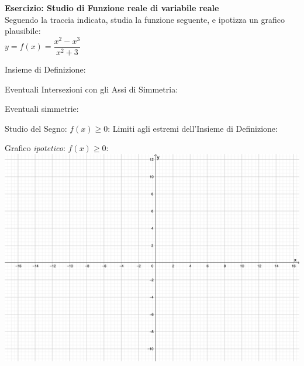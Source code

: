 \documentclass[12pt, a4paper, landscape]{exam}
\newcommand{\class}{\LARGE {Esercizio: Studio di Funzione reale di variabile reale}}
\begin{document}

{\huge{\bf \class}}\\

{\Large{Seguendo la traccia indicata, studia la funzione seguente, e ipotizza un grafico plausibile}}:\\

{\large {\(y = f(x) = \dfrac {x^2 - x^3}{x^2 + 3}\)}}\\


\begin{questions}

\begin{multicols}{2}
\question
Insieme di Definizione:
\fillwithdottedlines{0.5in}
\vspace{0.3cm}

\question
Eventuali Intersezioni con gli Assi di Simmetria:

\fillwithdottedlines{0.5in}
\vspace{0.2cm}

\question Eventuali simmetrie:
\fillwithdottedlines{0.5in}
\vspace{0.2cm}

\question Studio del Segno: \(f(x) \ge 0\):
\fillwithdottedlines{0.5in}
\vspace{0.2cm}
\question Limiti agli estremi dell'Insieme di Definizione:

\fillwithdottedlines{0.5in}
\vspace{0.2cm}

\question Grafico {\em ipotetico}: \(f(x) \ge 0\):\\

\includegraphics[width=\columnwidth, fbox]{grafico_empty.png}

%

\end{multicols}
\end{questions}
\end{document}
